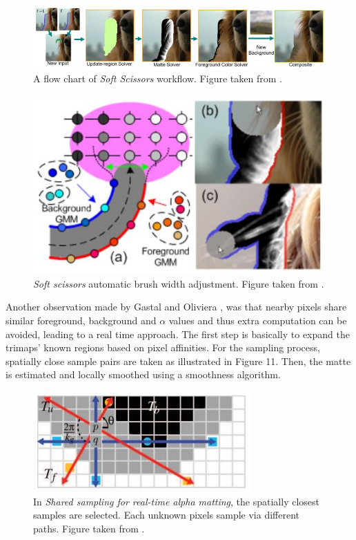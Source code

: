 \begin{figure}[t!]
\centering
\includegraphics[width=1\columnwidth]{Chapter2/2/robust_figure_2.jpg}
\caption[A flow chart of Soft Scissors workflow.]{A flow chart of \textit{Soft Scissors} workflow. Figure taken from \cite{softscissors}.}
\label{fig:robust-f2}
\end{figure}

\begin{figure}[t!]
\centering
\includegraphics[width=0.7\columnwidth]{Chapter2/2/robust_figure_3.jpg}
\caption[Soft scissors automatic brush width adjustment.]{\textit{Soft scissors} automatic brush width adjustment. Figure taken from \cite{softscissors}.}
\label{fig:robust-f3}
\end{figure}

Another observation made by Gastal and Oliviera \cite{shared}, was that nearby pixels share similar foreground, background and $\alpha$ values and thus extra computation can be avoided, leading to a real time approach. The first step is basically to expand the trimaps’ known regions based on pixel affinities. For the sampling process, spatially close sample pairs are taken as illustrated in Figure 11. Then, the matte is estimated and locally smoothed using a smoothness algorithm.

\begin{figure}[t!]
\centering
\includegraphics[width=0.6\columnwidth]{Chapter2/2/shared_figure_1.jpg}
\caption[\textit{Shared sampling for real-time alpha matting} sampling strategy.]{In \textit{Shared sampling for real-time alpha matting}, the spatially closest samples are selected. Each unknown pixels sample via different paths. Figure taken from \cite{shared}.}
\label{fig:shared-1}
\end{figure}

